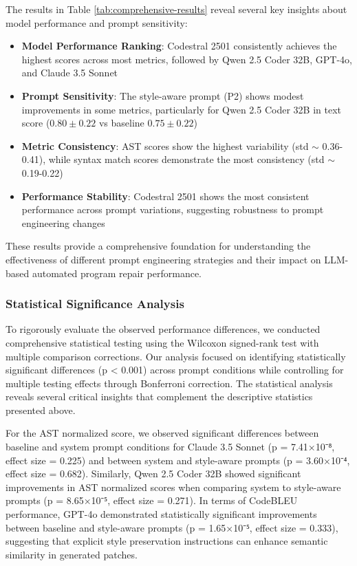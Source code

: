 The results in Table \ref{tab:comprehensive-results} reveal several key insights about model performance and prompt sensitivity:

\begin{itemize}
    \item \textbf{Model Performance Ranking}: Codestral 2501 consistently achieves the highest scores across most metrics, followed by Qwen 2.5 Coder 32B, GPT-4o, and Claude 3.5 Sonnet
    \item \textbf{Prompt Sensitivity}: The style-aware prompt (P2) shows modest improvements in some metrics, particularly for Qwen 2.5 Coder 32B in text score ($0.80 \pm 0.22$ vs baseline $0.75 \pm 0.22$)
    \item \textbf{Metric Consistency}: AST scores show the highest variability (std $\sim$ 0.36-0.41), while syntax match scores demonstrate the most consistency (std $\sim$ 0.19-0.22)
    \item \textbf{Performance Stability}: Codestral 2501 shows the most consistent performance across prompt variations, suggesting robustness to prompt engineering changes
\end{itemize}

These results provide a comprehensive foundation for understanding the effectiveness of different prompt engineering strategies and their impact on LLM-based automated program repair performance.

\subsubsection{Statistical Significance Analysis}
To rigorously evaluate the observed performance differences, we conducted comprehensive statistical testing using the Wilcoxon signed-rank test with multiple comparison corrections. Our analysis focused on identifying statistically significant differences (p < 0.001) across prompt conditions while controlling for multiple testing effects through Bonferroni correction. The statistical analysis reveals several critical insights that complement the descriptive statistics presented above.

For the AST normalized score, we observed significant differences between baseline and system prompt conditions for Claude 3.5 Sonnet (p = 7.41×10⁻⁸, effect size = 0.225) and between system and style-aware prompts (p = 3.60×10⁻⁴, effect size = 0.682). Similarly, Qwen 2.5 Coder 32B showed significant improvements in AST normalized scores when comparing system to style-aware prompts (p = 8.65×10⁻⁵, effect size = 0.271). In terms of CodeBLEU performance, GPT-4o demonstrated statistically significant improvements between baseline and style-aware prompts (p = 1.65×10⁻⁵, effect size = 0.333), suggesting that explicit style preservation instructions can enhance semantic similarity in generated patches.

